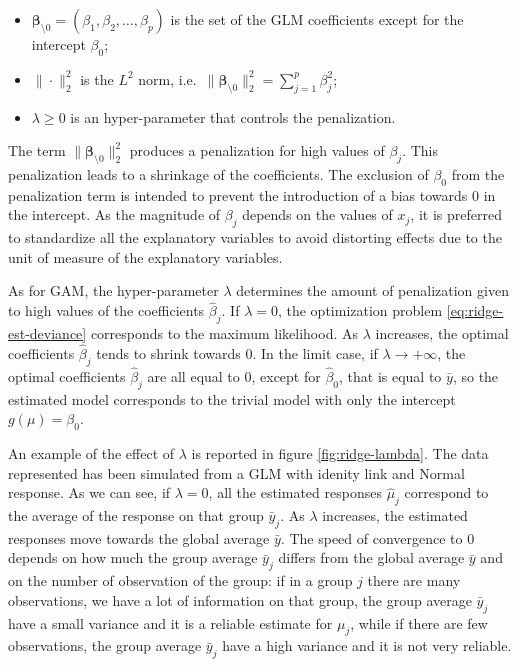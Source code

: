\documentclass[a4paper, nobind]{templates/ociamthesis}
\providecommand{\tightlist}{%
  \setlength{\itemsep}{0pt}\setlength{\parskip}{0pt}}
\theoremstyle{definition}
\theoremstyle{definition}
\theoremstyle{definition}
\theoremstyle{remark}
\begin{document}
\begin{itemize}
\tightlist
\item
  \(\boldsymbol{\beta}_{\setminus0} = \left(\beta_1, \beta_2, \dots, \beta_p\right)\) is the set of the GLM coefficients except for the intercept \(\beta_0\);
\item
  \(\|\cdot\|_2^2\) is the \(L^2\) norm, i.e.~\(\|\boldsymbol{\beta}_{\setminus0}\|_2^2 = \sum_{j=1}^p{\beta_j^2}\);
\item
  \(\lambda\ge0\) is an hyper-parameter that controls the penalization.
\end{itemize}

The term \(\|\boldsymbol{\beta}_{\setminus0}\|_2^2\) produces a penalization for high values of \(\beta_j\). This penalization leads to a shrinkage of the coefficients.
The exclusion of \(\beta_0\) from the penalization term is intended to prevent the introduction of a bias towards \(0\) in the intercept. As the magnitude of \(\beta_j\) depends on the values of \(x_j\), it is preferred to standardize all the explanatory variables to avoid distorting effects due to the unit of measure of the explanatory variables.

As for GAM, the hyper-parameter \(\lambda\) determines the amount of penalization given to high values of the coefficients \(\hat{\beta}_j\). If \(\lambda=0\), the optimization problem \eqref{eq:ridge-est-deviance} corresponds to the maximum likelihood. As \(\lambda\) increases, the optimal coefficients \(\hat{\beta}_j\) tends to shrink towards \(0\). In the limit case, if \(\lambda\to+\infty\), the optimal coefficients \(\hat{\beta}_j\) are all equal to \(0\), except for \(\hat{\beta}_0\), that is equal to \(\bar{y}\), so the estimated model corresponds to the trivial model with only the intercept \(g(\mu)=\beta_0\).

An example of the effect of \(\lambda\) is reported in figure \ref{fig:ridge-lambda}. The data represented has been simulated from a GLM with idenity link and Normal response. As we can see, if \(\lambda=0\), all the estimated responses \(\hat{\mu}_j\) correspond to the average of the response on that group \(\bar{y}_j\). As \(\lambda\) increases, the estimated responses move towards the global average \(\bar{y}\). The speed of convergence to \(0\) depends on how much the group average \(\bar{y}_j\) differs from the global average \(\bar{y}\) and on the number of observation of the group: if in a group \(j\) there are many observations, we have a lot of information on that group, the group average \(\bar{y}_j\) have a small variance and it is a reliable estimate for \(\mu_j\), while if there are few observations, the group average \(\bar{y}_j\) have a high variance and it is not very reliable.
\end{document}
